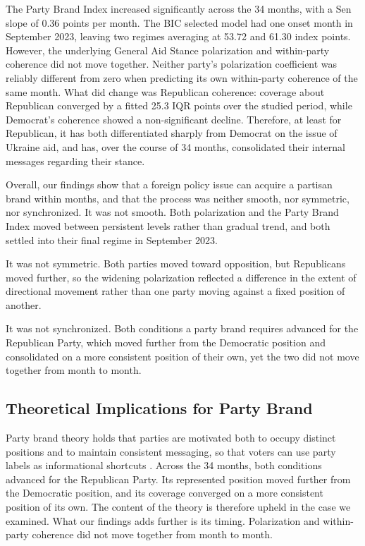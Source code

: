The Party Brand Index increased significantly across the 34 months, with a Sen slope of 0.36 points per month. The BIC selected model had one onset month in September 2023, leaving two regimes averaging at 53.72 and 61.30 index points. However, the underlying General Aid Stance polarization and within-party coherence did not move together. Neither party's polarization coefficient was reliably different from zero when predicting its own within-party coherence of the same month. What did change was Republican coherence: coverage about Republican converged by a fitted 25.3 IQR points over the studied period, while Democrat's coherence showed a non-significant decline. Therefore, at least for Republican, it has both differentiated sharply from Democrat on the issue of Ukraine aid, and has, over the course of 34 months, consolidated their internal messages regarding their stance.

Overall, our findings show that a foreign policy issue can acquire a partisan brand within months, and that the process was neither smooth, nor symmetric, nor synchronized. It was not smooth. Both polarization and the Party Brand Index moved between persistent levels rather than gradual trend, and both settled into their final regime in September 2023.

It was not symmetric. Both parties moved toward opposition, but Republicans moved further, so the widening polarization reflected a difference in the extent of directional movement rather than one party moving against a fixed position of another.

It was not synchronized. Both conditions a party brand requires advanced for the Republican Party, which moved further from the Democratic position and consolidated on a more consistent position of their own, yet the two did not move together from month to month.

\subsection{Theoretical Implications for Party Brand}

Party brand theory holds that parties are motivated both to occupy distinct positions and to maintain consistent messaging, so that voters can use party labels as informational shortcuts \citep{lupuPartyBrandsPartisanship2013,lupuPartyBrandsCrisis2016}. Across the 34 months, both conditions advanced for the Republican Party. Its represented position moved further from the Democratic position, and its coverage converged on a more consistent position of its own. The content of the theory is therefore upheld in the case we examined. What our findings adds further is its timing. Polarization and within-party coherence did not move together from month to month.

